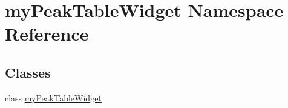 \hypertarget{namespacemy_peak_table_widget}{\section{my\-Peak\-Table\-Widget Namespace Reference}
\label{namespacemy_peak_table_widget}
}
\subsection*{Classes}
\begin{DoxyCompactItemize}
\item 
class \hyperlink{classmy_peak_table_widget_1_1my_peak_table_widget}{my\-Peak\-Table\-Widget}
\end{DoxyCompactItemize}
